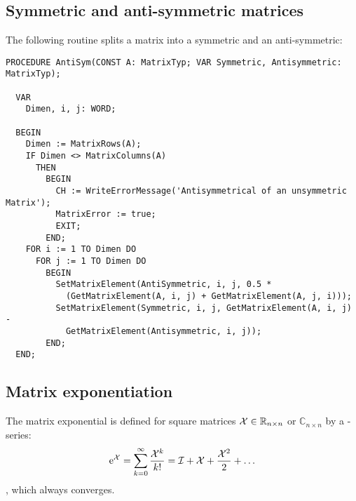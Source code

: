 \begin{refsection}
\subsection{Symmetric and anti-symmetric matrices}

The following routine splits a matrix into a symmetric and an anti-symmetric:

\begin{lstlisting}[caption=split matrix in symmetric and anti-symmetic]
  PROCEDURE AntiSym(CONST A: MatrixTyp; VAR Symmetric, Antisymmetric: MatrixTyp);

  VAR
    Dimen, i, j: WORD;

  BEGIN
    Dimen := MatrixRows(A);
    IF Dimen <> MatrixColumns(A)
      THEN
        BEGIN
          CH := WriteErrorMessage('Antisymmetrical of an unsymmetric Matrix');
          MatrixError := true;
          EXIT;
        END;
    FOR i := 1 TO Dimen DO
      FOR j := 1 TO Dimen DO
        BEGIN
          SetMatrixElement(AntiSymmetric, i, j, 0.5 *
            (GetMatrixElement(A, i, j) + GetMatrixElement(A, j, i)));
          SetMatrixElement(Symmetric, i, j, GetMatrixElement(A, i, j) -
            GetMatrixElement(Antisymmetric, i, j));
        END;
  END;
\end{lstlisting}

\subsection{Matrix exponentiation}

The matrix exponential is defined for square matrices \( \mathcal{X} \in \mathbb{R}_{n\times n} \) or \( \mathbb{C}_{n\times n} \) by a -series:
\begin{equation}
  \mathrm{e}^{\mathcal{X}} = \sum_{k=0}^\infty{\frac{\ensuremath{\mathcal{X}}^k}{k!}} = \mathcal{I} + \mathcal{X} + \frac{\mathcal{X}^2}{2} + \ldots
\end{equation}
, which always converges.


\end{refsection}

